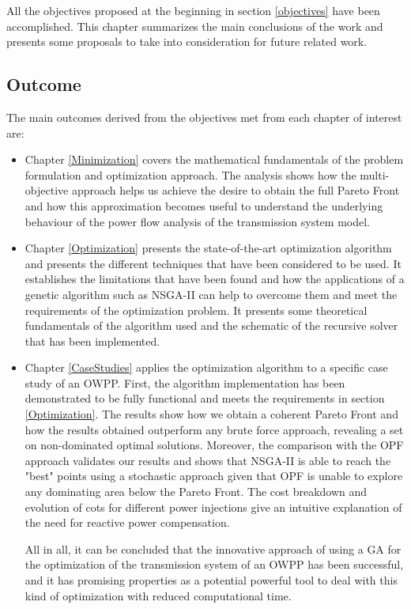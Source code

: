 \documentclass[a4paper,11pt, titlepage, twoside]{article}
\begin{document}
All the objectives proposed at the beginning in section \ref{objectives} have been accomplished. This chapter summarizes
the main conclusions of the work and presents some proposals to take into consideration for future
related work.

\subsection{Outcome}

The main outcomes derived from the objectives met from each chapter of interest are:
\begin{itemize}
    \item Chapter \ref{Minimization} covers the  mathematical fundamentals of the problem formulation and optimization approach. The analysis shows how the multi-objective approach helps us achieve
    the desire to obtain the full Pareto Front and how this approximation becomes useful to understand the underlying behaviour of the power flow analysis of the transmission system model.

    \item Chapter \ref{Optimization} presents the state-of-the-art optimization algorithm and presents the different techniques that have been considered to be used.
    It establishes the limitations that have been found and how the applications of a genetic algorithm such as NSGA-II
    can help to overcome them and meet the requirements of the optimization problem. It presents some theoretical fundamentals of the algorithm used and the schematic of the recursive solver that has been implemented.

    \item Chapter \ref{CaseStudies} applies the optimization algorithm to a specific case study of an OWPP. First, the algorithm implementation has been demonstrated to be fully functional and meets the requirements in section \ref{Optimization}.
    The results show how we obtain a coherent Pareto Front and how the results obtained outperform any brute force approach, revealing a set on non-dominated optimal solutions. Moreover, the comparison with the OPF approach validates our results and shows that
    NSGA-II is able to reach the "best" points using a stochastic approach given that OPF is unable to explore any dominating area below the Pareto Front. The cost breakdown and evolution of cots for different power injections give an intuitive 
    explanation of the need for reactive power compensation.\par
    All in all, it can be concluded that the innovative approach of using a GA for the optimization of the transmission system of an OWPP has been successful, and it has promising properties as a potential powerful tool to deal with this kind of optimization
    with reduced computational time.

\end{itemize}
\end{document}
